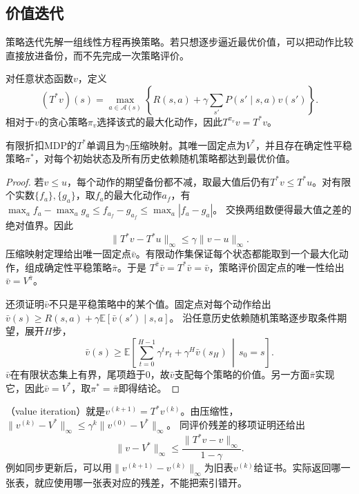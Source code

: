 \subsection{价值迭代}
\label{sec:rl-planning-value-iteration}

策略迭代先解一组线性方程再换策略。若只想逐步逼近最优价值，可以把动作比较直接放进备份，而不先完成一次策略评价。

\begin{definition}[最优Bellman算子]
 \label{def:rl-planning-optimal-operator}
 对任意状态函数$v$，定义
 \begin{equation}
 (T^*v)(s)=\max_{a\in\mathcal A(s)}
 \left\{R(s,a)+\gamma\sum_{s'}P(s'\mid s,a)v(s')\right\}.
 \label{eq:rl-planning-optimal-operator}
 \end{equation}
 相对于$v$的贪心策略$\pi_v$选择该式的最大化动作，因此$T^{\pi_v}v=T^*v$。
\end{definition}

\begin{theorem}[最优固定点与平稳最优策略]
 \label{thm:rl-planning-optimal-fixed-point}
 有限折扣MDP的$T^*$单调且为$\gamma$压缩映射。其唯一固定点为$V^*$，并且存在确定性平稳策略$\pi^*$，对每个初始状态及所有历史依赖随机策略都达到最优价值。
\end{theorem}
\begin{proof}
 若$v\leq u$，每个动作的期望备份都不减，取最大值后仍有$T^*v\leq T^*u$。对有限个实数$\{f_a\},\{g_a\}$，取$f_a$的最大化动作$a_f$，有
 $\max_a f_a-\max_a g_a\leq f_{a_f}-g_{a_f}\leq\max_a|f_a-g_a|$。
 交换两组数便得最大值之差的绝对值界。因此
 \[
 \lVert T^*v-T^*u\rVert_\infty
 \leq\gamma\lVert v-u\rVert_\infty.
 \]
 压缩映射定理给出唯一固定点$\bar v$。有限动作集保证每个状态都能取到一个最大化动作，组成确定性平稳策略$\bar\pi$。于是
 $T^{\bar\pi}\bar v=T^*\bar v=\bar v$，策略评价固定点的唯一性给出$\bar v=V^{\bar\pi}$。

 还须证明$\bar v$不只是平稳策略中的某个值。固定点对每个动作给出
 $\bar v(s)\geq R(s,a)+\gamma\mathbb E[\bar v(s')\mid s,a]$。
 沿任意历史依赖随机策略逐步取条件期望，展开$H$步，
 \[
 \bar v(s)\geq\mathbb E\!\left[
 \sum_{t=0}^{H-1}\gamma^t r_t+\gamma^H\bar v(s_H)
 \,\middle|\,s_0=s\right].
 \]
 $\bar v$在有限状态集上有界，尾项趋于0，故$\bar v$支配每个策略的价值。另一方面$\bar\pi$实现它，因此$\bar v=V^*$，取$\pi^*=\bar\pi$即得结论。
\end{proof}

（value iteration）就是$v^{(k+1)}=T^*v^{(k)}$。由压缩性，
$\lVert v^{(k)}-V^*\rVert_\infty\leq\gamma^k\lVert v^{(0)}-V^*\rVert_\infty$。
同评价残差的移项证明还给出
\begin{equation}
 \lVert v-V^*\rVert_\infty
 \leq\frac{\lVert T^*v-v\rVert_\infty}{1-\gamma}.
 \label{eq:rl-planning-optimal-residual}
\end{equation}
例如同步更新后，可以用$\lVert v^{(k+1)}-v^{(k)}\rVert_\infty$为旧表$v^{(k)}$给证书。实际返回哪一张表，就应使用哪一张表对应的残差，不能把索引错开。

